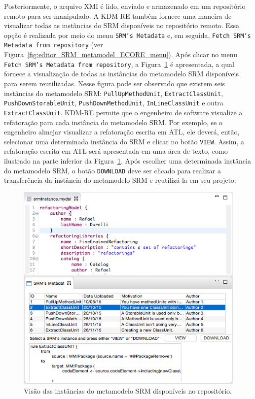 Posteriormente, o arquivo XMI é lido, enviado e armazenado em um repositório remoto para ser manipulado. A KDM-RE também fornece uma maneira de visualizar todas as instâncias do SRM disponíveis no repositório remoto. Essa opção é realizada por meio do menu \texttt{SRM's Metadata} e, em seguida, \texttt{Fetch SRM's Metadata from repository} (ver Figura~\ref{fig:editor_SRM_metamodel_ECORE_menu}). Após clicar no menu \texttt{Fetch SRM's Metadata from repository}, a Figura~\ref{fig:download_kDM_re_repository} é apresentada, a qual fornece a visualização de todas as instâncias do metamodelo SRM disponíveis para serem reutilizadas. Nesse figura pode ser observado que existem seis instâncias do metamodelo SRM: \texttt{PullUpMethodUnit}, \texttt{ExtractClassUnit}, \texttt{PushDownStorableUnit}, \texttt{PushDownMethodUnit}, \texttt{InLineClassUnit} e outra \texttt{ExtractClassUnit}. KDM-RE permite que o engenheiro de software visualize a refatoração para cada instância do metamodelo SRM. Por exemplo, se o engenheiro almejar visualizar a refatoração escrita em ATL, ele deverá, então, selecionar uma determinada instância do SRM e clicar no botão \texttt{VIEW}. Assim, a refatoração escrita em ATL será apresentada em uma área de texto, como ilustrado na parte inferior da Figura~\ref{fig:download_kDM_re_repository}. Após escolher uma determinada instância do metamodelo SRM, o botão \texttt{DOWNLOAD} deve ser clicado para realizar a transferência da instância do metamodelo SRM e reutilizá-la em seu projeto. 

\begin{figure}[!h]
	\centering
	\caption{Visão das instâncias do metamodelo SRM disponíveis no repositório.}
	\label{fig:download_kDM_re_repository}
	\includegraphics[scale=0.6]{images/DOWNLOAD_KDM_RE}
	\fautor
\end{figure}


